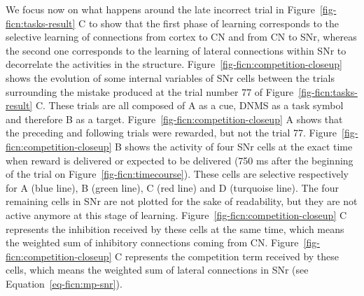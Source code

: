 \documentclass[
  11pt,
  a4paper,
]{scrbook}
\begin{document}
We focus now on what happens around the late incorrect trial in
Figure~\ref{fig-ficn:tasks-result} C to show that the first phase of
learning corresponds to the selective learning of connections from
cortex to CN and from CN to SNr, whereas the second one corresponds to
the learning of lateral connections within SNr to decorrelate the
activities in the structure. Figure~\ref{fig-ficn:competition-closeup}
shows the evolution of some internal variables of SNr cells between the
trials surrounding the mistake produced at the trial number 77 of
Figure~\ref{fig-ficn:tasks-result} C. These trials are all composed of A
as a cue, DNMS as a task symbol and therefore B as a target.
Figure~\ref{fig-ficn:competition-closeup} A shows that the preceding and
following trials were rewarded, but not the trial 77.
Figure~\ref{fig-ficn:competition-closeup} B shows the activity of four
SNr cells at the exact time when reward is delivered or expected to be
delivered (750 ms after the beginning of the trial on
Figure~\ref{fig-ficn:timecourse}). These cells are selective
respectively for A (blue line), B (green line), C (red line) and D
(turquoise line). The four remaining cells in SNr are not plotted for
the sake of readability, but they are not active anymore at this stage
of learning. Figure~\ref{fig-ficn:competition-closeup} C represents the
inhibition received by these cells at the same time, which means the
weighted sum of inhibitory connections coming from CN.
Figure~\ref{fig-ficn:competition-closeup} C represents the competition
term received by these cells, which means the weighted sum of lateral
connections in SNr (see Equation~\ref{eq-ficn:mp-snr}).
\end{document}

